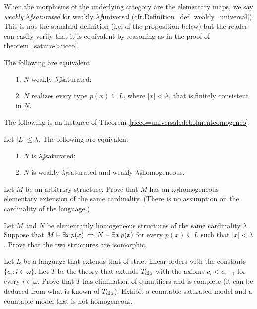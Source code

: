 \documentclass[creche.tex]{subfiles}
\begin{document}
When the morphisms of the underlying category are the elementary maps, we say \emph{weakly $\lambda\jj$saturated} for weakly $\lambda\jj$universal (cfr.\@ Definition~\ref{def_weakly_universal}). This is not the standard definition (i.e.\@ {} of the proposition below) but the reader can easily verify that it is equivalent by reasoning as in the proof of theorem~\ref{saturo->ricco}.

\begin{proposition}\label{prop_w_saturation}
The following are equivalent
\begin{itemize}
\item[1.] $N$ weakly $\lambda\jj$saturated;
\item[2.] $N$ realizes every type $p(x)\subseteq L$, where $|x|<\lambda$, that is finitely consistent in $N$.\QED
\end{itemize}
\end{proposition}

The following is an instance of Theorem~\ref{ricco=universaledebolmenteomogeneo}.

\begin{corollary}\label{saturo=universaledebolmenteomogeneo}
Let $|L|\le\lambda$. The following are equivalent\nobreak
\begin{itemize}
\item[1.] $N$ is $\lambda\jj$saturated;
\item[2.] $N$ is weakly $\lambda\jj$saturated and weakly $\lambda\jj$homogeneous.\QED
\end{itemize}
\end{corollary}


\begin{exercise}\label{ex_omega_homogeneous_same_card}
Let $M$ be an arbitrary structure. Prove that $M$ has an $\omega\jj$homogeneous elementary extension of the same cardinality. (There is no assumption on the cardinality of the language.)\QED 
\end{exercise}

\begin{exercise}
Let $M$ and $N$ be elementarily homogeneous structures of the same cardinality $\lambda$. Suppose that $M\vDash\exists x\, p(x)\,\Leftrightarrow\,N\vDash\exists x\, p(x)$ for every $p(x)\subseteq L$ such that $|x|<\lambda$. Prove that the two structures are isomorphic.\QED 
\end{exercise}

\begin{exercise}\label{vaughtesempio}
Let $L$ be a language that extends that of strict linear orders with the constants $\{c_i: i\in\omega\}$. Let $T$ be the theory that extends $T_{\rm dlo}$ with the axioms $c_i<c_{i+1}$ for every  $i\in\omega$. Prove that $T$ has elimination of quantifiers and is complete (it can be deduced from what is known of $T_{\rm dlo}$). Exhibit a countable saturated model and a countable model that is not homogeneous.\QED 
\end{exercise}
\end{document}
